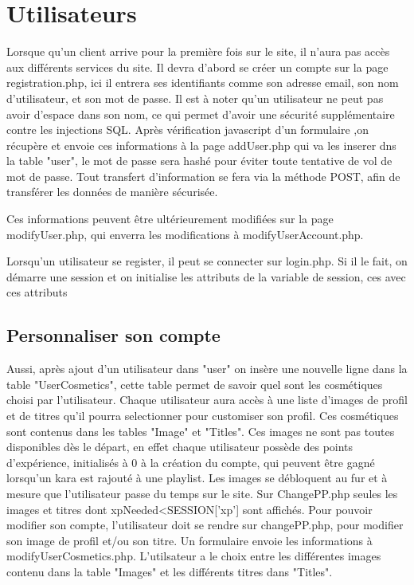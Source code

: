 \section{Utilisateurs}

Lorsque qu'un client arrive pour la première fois sur le site, il n'aura pas accès aux différents services du site. Il devra d'abord se créer un compte sur la page registration.php, ici il entrera ses 
identifiants comme son adresse email, son nom d'utilisateur, et son mot de passe.\newline
Il est à noter qu'un utilisateur ne peut pas avoir d'espace dans son nom, ce qui permet d'avoir une sécurité supplémentaire contre les injections SQL.\newline
Après vérification javascript d'un formulaire ,on récupère et envoie ces informations à la page addUser.php qui va les inserer dns la table "user", le mot de passe sera hashé pour éviter toute tentative de vol de mot de passe. Tout transfert d'information se fera via la méthode POST, afin de transférer les données de manière sécurisée.
\newline

Ces informations peuvent être  ultérieurement modifiées sur la page modifyUser.php, qui enverra les modifications à modifyUserAccount.php.\newline

Lorsqu'un utilisateur se register, il peut se connecter sur login.php. Si il le fait, on démarre une session et on initialise les attributs de la variable de session, ces avec ces attributs 

\subsection{Personnaliser son compte}

Aussi, après ajout d'un utilisateur dans "user" on insère une nouvelle ligne dans la table "UserCosmetics", cette table permet de savoir quel sont les cosmétiques choisi par l'utilisateur.  
Chaque utilisateur aura accès à une liste d'images de profil et de titres qu'il pourra selectionner pour customiser son profil. Ces cosmétiques sont contenus dans les tables "Image" et "Titles". 
\newline
Ces images ne sont pas toutes disponibles dès le départ, en effet chaque utilisateur possède des points d'expérience, initialisés à 0 à la création du compte, qui peuvent être gagné lorsqu'un kara est rajouté à une playlist. Les images se débloquent au fur et à mesure que l'utilisateur passe du temps sur le site. Sur ChangePP.php seules les images et titres dont xpNeeded<SESSION['xp'] sont affichés.\newline
Pour pouvoir modifier son compte, l'utilisateur doit se rendre sur changePP.php, pour modifier son image de profil et/ou son titre. Un formulaire envoie les informations à modifyUserCosmetics.php. L'utilsateur a le choix entre les différentes images contenu dans la table "Images" et les différents titres dans "Titles". \newline

